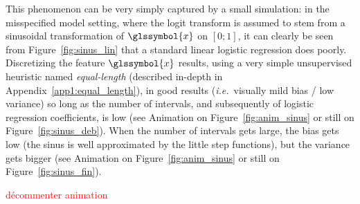 This phenomenon can be very simply captured by a small simulation: in the misspecified model setting, where the logit transform is assumed to stem from a sinusoidal transformation of $\glssymbol{x}$ on $[0;1]$, it can clearly be seen from Figure~\ref{fig:sinus_lin} that a standard linear logistic regression does poorly. Discretizing the feature $\glssymbol{x}$ results, using a very simple unsupervised heuristic named \textit{equal-length} (described in-depth in Appendix~\ref{app1:equal_length}), in good results (\textit{i.e.}\ visually mild bias / low variance) so long as the number of intervals, and subsequently of logistic regression coefficients, is low (see Animation on Figure~\ref{fig:anim_sinus} or still on Figure~\ref{fig:sinus_deb}). When the number of intervals gets large, the bias gets low (the sinus is well approximated by the little step functions), but the variance gets bigger (see Animation on Figure~\ref{fig:anim_sinus} or still on Figure~\ref{fig:sinus_fin}).


\textcolor{red}{décommenter animation}


